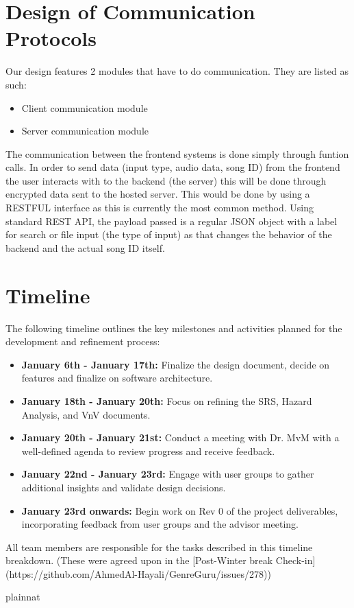 \documentclass[12pt, titlepage]{article}
\begin{document}
\section{Design of Communication Protocols}
Our design features 2 modules that have to do communication. They are listed as such: 
\begin{itemize}
  \item Client communication module
  \item Server communication module
\end{itemize}
The communication between the frontend systems is done simply through funtion calls. In order to send data (input type, audio data, song ID) from the frontend the user 
interacts with to the backend (the server) this will be done through encrypted data sent to the hosted server. This would be done by using
a RESTFUL interface as this is currently the most common method. Using standard REST API, the payload passed is a regular JSON object with 
a label for search or file input (the type of input) as that changes the behavior of the backend and the actual song ID itself. 

\section{Timeline}

The following timeline outlines the key milestones and activities planned for the development and refinement process:

\begin{itemize}
    \item \textbf{January 6th - January 17th:} Finalize the design document, decide on features and finalize on software architecture.
    \item \textbf{January 18th - January 20th:} Focus on refining the SRS, Hazard Analysis, and VnV documents.
    \item \textbf{January 20th - January 21st:} Conduct a meeting with Dr. MvM with a well-defined agenda to review progress and receive feedback.
    \item \textbf{January 22nd - January 23rd:} Engage with user groups to gather additional insights and validate design decisions.
    \item \textbf{January 23rd onwards:} Begin work on Rev 0 of the project deliverables, incorporating feedback from user groups and the advisor meeting.
\end{itemize}

All team members are responsible for the tasks described in this timeline breakdown. (These were agreed upon in the [Post-Winter break Check-in](https://github.com/AhmedAl-Hayali/GenreGuru/issues/278))


 {plainnat}


\newpage{}
\end{document}

